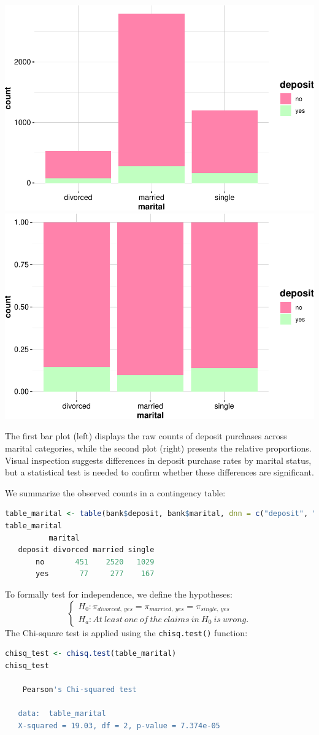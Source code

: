 \documentclass[
]{book}
\newcommand{\passthrough}[1]{#1}
\theoremstyle{definition}
\theoremstyle{definition}
\theoremstyle{definition}
\theoremstyle{definition}
\theoremstyle{remark}
\begin{document}
\includegraphics[width=0.5\linewidth]{statistics_files/figure-latex/unnamed-chunk-13-1} \includegraphics[width=0.5\linewidth]{statistics_files/figure-latex/unnamed-chunk-13-2}

The first bar plot (left) displays the raw counts of deposit purchases across marital categories, while the second plot (right) presents the relative proportions. Visual inspection suggests differences in deposit purchase rates by marital status, but a statistical test is needed to confirm whether these differences are significant.

We summarize the observed counts in a contingency table:

\begin{lstlisting}[language=R]
table_marital <- table(bank$deposit, bank$marital, dnn = c("deposit", "marital"))
table_marital
          marital
   deposit divorced married single
       no       451    2520   1029
       yes       77     277    167
\end{lstlisting}

To formally test for independence, we define the hypotheses:
\[
\begin{cases}
    H_0: \pi_{divorced, \ yes} = \pi_{married, \ yes} = \pi_{single, \ yes}  \\
    H_a: At \ least \ one \ of \ the \ claims \ in \ H_0 \ is \ wrong.
\end{cases}
\]
The Chi-square test is applied using the \passthrough{\lstinline!chisq.test()!} function:

\begin{lstlisting}[language=R]
chisq_test <- chisq.test(table_marital)
chisq_test
   
    Pearson's Chi-squared test
   
   data:  table_marital
   X-squared = 19.03, df = 2, p-value = 7.374e-05
\end{lstlisting}
\end{document}
